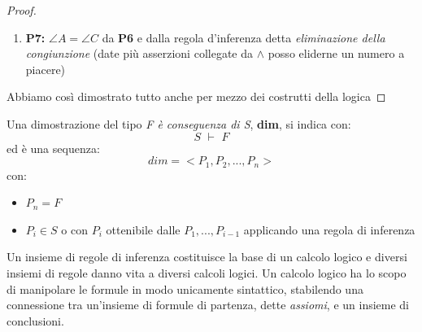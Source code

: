 \documentclass[a4paper,12pt, oneside]{book}
\begin{document}
\begin{proof}
\begin{enumerate}
		\item \textbf{P7:} $\angle A=\angle C$ da \textbf{P6} e dalla regola d'inferenza detta \textit{eliminazione della congiunzione} (date più asserzioni collegate da $\wedge$ posso eliderne un numero a piacere)
	\end{enumerate}
	Abbiamo così dimostrato tutto anche per mezzo dei costrutti della logica
\end{proof}
\begin{definizione}
	Una dimostrazione del tipo \textit{F è conseguenza di S}, \textbf{dim}, si indica con:
	$$S\,\,\vdash\,\, F$$
	ed è una sequenza:
	$$dim=<P_1,P_2,...,P_n>$$
	con:
	\begin{itemize}
		\item $P_n=F$
		\item $P_i\in S$ o con $P_i$ ottenibile dalle $P_1,...,P_{i-1}$ applicando una regola di inferenza
	\end{itemize}
\end{definizione}
Un insieme di regole di inferenza costituisce la base di un calcolo logico e diversi insiemi di regole danno vita a diversi calcoli logici. Un calcolo logico ha lo scopo di manipolare le formule in modo unicamente sintattico, stabilendo una connessione tra un'insieme di formule di partenza, dette \textit{assiomi}, e un insieme di conclusioni.
\end{document}
